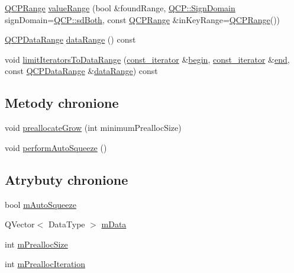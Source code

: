 \begin{DoxyCompactItemize}
\hyperlink{class_q_c_p_range}{Q\+C\+P\+Range} \hyperlink{class_q_c_p_data_container_a35a102dc2424d1228fc374d9313efbe9}{value\+Range} (bool \&found\+Range, \hyperlink{namespace_q_c_p_afd50e7cf431af385614987d8553ff8a9}{Q\+C\+P\+::\+Sign\+Domain} sign\+Domain=\hyperlink{namespace_q_c_p_afd50e7cf431af385614987d8553ff8a9aa38352ef02d51ddfa4399d9551566e24}{Q\+C\+P\+::sd\+Both}, const \hyperlink{class_q_c_p_range}{Q\+C\+P\+Range} \&in\+Key\+Range=\hyperlink{class_q_c_p_range}{Q\+C\+P\+Range}())
\item 
\hyperlink{class_q_c_p_data_range}{Q\+C\+P\+Data\+Range} \hyperlink{class_q_c_p_data_container_a0aa30487aa557b38c2e10f918454c085}{data\+Range} () const 
\item 
void \hyperlink{class_q_c_p_data_container_ad55f9e9c95ab4414b477d2f08ffd9bd7}{limit\+Iterators\+To\+Data\+Range} (\hyperlink{class_q_c_p_data_container_ae40a91f5cb0bcac61d727427449b7d15}{const\+\_\+iterator} \&\hyperlink{class_q_c_p_data_container_a80032518413ab8f418f7c81182fd06cb}{begin}, \hyperlink{class_q_c_p_data_container_ae40a91f5cb0bcac61d727427449b7d15}{const\+\_\+iterator} \&\hyperlink{class_q_c_p_data_container_acf66dfad83fe041380f5e0491e7676f2}{end}, const \hyperlink{class_q_c_p_data_range}{Q\+C\+P\+Data\+Range} \&\hyperlink{class_q_c_p_data_container_a0aa30487aa557b38c2e10f918454c085}{data\+Range}) const 
\end{DoxyCompactItemize}
\subsection*{Metody chronione}
\begin{DoxyCompactItemize}
\item 
void \hyperlink{class_q_c_p_data_container_aae8cdb2bcc3b900ec22f26df3e7d67c7}{preallocate\+Grow} (int minimum\+Prealloc\+Size)
\item 
void \hyperlink{class_q_c_p_data_container_a83c25ac14be1c920df85e797ee75c982}{perform\+Auto\+Squeeze} ()
\end{DoxyCompactItemize}
\subsection*{Atrybuty chronione}
\begin{DoxyCompactItemize}
\item 
bool \hyperlink{class_q_c_p_data_container_aae64c517d64511ad7a81ff8ee7b29147}{m\+Auto\+Squeeze}
\item 
Q\+Vector$<$ Data\+Type $>$ \hyperlink{class_q_c_p_data_container_a74906b4da829849c4062b5337c72585d}{m\+Data}
\item 
int \hyperlink{class_q_c_p_data_container_a3554d3ad00e69f7ce057efa00ea6f4b2}{m\+Prealloc\+Size}
\item 
int \hyperlink{class_q_c_p_data_container_ab2115bf023c29691f441eaf1889de84a}{m\+Prealloc\+Iteration}
\end{DoxyCompactItemize}
